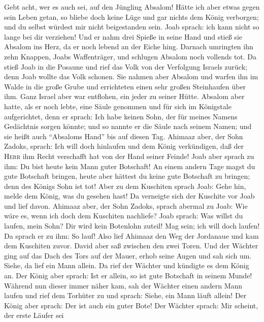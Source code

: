 Gebt acht, wer es auch sei, auf den Jüngling Absalom! 
Hätte ich aber etwas gegen sein Leben getan, so bliebe doch keine Lüge
und gar nichts dem König verborgen; und du selbst würdest mir nicht
beigestanden sein.  Joab sprach: ich kann nicht so lange
bei dir verziehen! Und er nahm drei Spieße in seine Hand und stieß sie
Absalom ins Herz, da er noch lebend an der Eiche hing. 
Darnach umringten ihn zehn Knappen, Joabs Waffenträger, und schlugen
Absalom noch vollends tot.  Da stieß Joab in die Posaune
und rief das Volk von der Verfolgung Israels zurück; denn Joab wollte
das Volk schonen.  Sie nahmen aber Absalom und warfen ihn
im Walde in die große Grube und errichteten einen sehr großen
Steinhaufen über ihm. Ganz Israel aber war entflohen, ein jeder zu
seiner Hütte.  Absalom aber hatte, als er noch lebte,
eine Säule genommen und für sich im Königstale aufgerichtet, denn er
sprach: Ich habe keinen Sohn, der für meines Namens Gedächtnis sorgen
könnte; und so nannte er die Säule nach seinem Namen; und sie heißt auch
``Absaloms Hand'' bis auf diesen Tag.  Ahimaaz aber, der
Sohn Zadoks, sprach: Ich will doch hinlaufen und dem König verkündigen,
daß der \textsc{Herr} ihm Recht verschafft hat von der Hand seiner
Feinde!  Joab aber sprach zu ihm: Du bist heute kein Mann
guter Botschaft! An einem andern Tage magst du gute Botschaft bringen,
heute aber hättest du keine gute Botschaft zu bringen; denn des Königs
Sohn ist tot!  Aber zu dem Kuschiten sprach Joab: Gehe
hin, melde dem König, was du gesehen hast! Da verneigte sich der
Kuschite vor Joab und lief davon.  Ahimaaz aber, der Sohn
Zadoks, sprach abermal zu Joab: Wie wäre es, wenn ich doch dem Kuschiten
nachliefe? Joab sprach: Was willst du laufen, mein Sohn? Dir wird kein
Botenlohn zuteil!  Mag sein; ich will doch laufen! Da
sprach er zu ihm: So lauf! Also lief Ahimaaz den Weg der Jordanaue und
kam dem Kuschiten zuvor.  David aber saß zwischen den
zwei Toren. Und der Wächter ging auf das Dach des Tors auf der Mauer,
erhob seine Augen und sah sich um. Siehe, da lief ein Mann allein.
 Da rief der Wächter und kündigte es dem König an. Der
König aber sprach: Ist er allein, so ist gute Botschaft in seinem Munde!
 Während nun dieser immer näher kam, sah der Wächter
einen andern Mann laufen und rief dem Torhüter zu und sprach: Siehe, ein
Mann läuft allein! Der König aber sprach: Der ist auch ein guter Bote!
 Der Wächter sprach: Mir scheint, der erste Läufer sei
